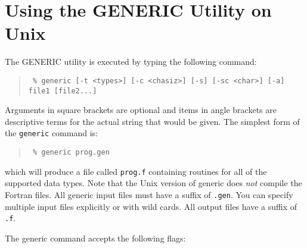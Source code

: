 \section{Using the GENERIC Utility on Unix}

The GENERIC utility is executed by typing the following command:

\begin{quote}{\tt
\% generic [-t <types>] [-c <chasiz>] [-s] [-sc <char>] [-a] file1 [file2...]
}
\end{quote}

Arguments in square brackets are optional and items in angle brackets are
descriptive terms for the actual string that would be given. The simplest form
of the {\tt generic} command is:

\begin{quote}{\tt
\% generic prog.gen
}
\end{quote}

which will produce a file called {\tt prog.f} containing routines for all of
the supported data types. Note that the Unix version of generic does {\em not}
compile the Fortran files. All generic input files must have a suffix of
{\tt .gen}. You can specify multiple input files explicitly or with wild cards.
All output files have a suffix of {\tt .f}.

The generic command accepts the following flags:


